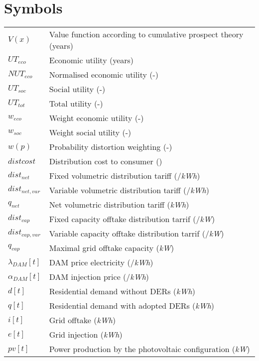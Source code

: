 \documentclass[master=ene,english]{kulemt}
\begin{document}
\section*{Symbols}
\begin{flushleft}
  \renewcommand{\arraystretch}{1.1}
  \begin{tabularx}{\textwidth}{@{}p{12mm}X@{}}
    $V(x)$    & Value function according to cumulative prospect theory (years)\\
    $UT_{eco}$   & Economic utility (years) \\
    $NUT_{eco}$   & Normalised economic utility (-)\\
    $UT_{soc}$ & Social utility (-)\\
    $UT_{tot}$ & Total utility (-)\\
    $w_{eco}$ & Weight economic utility (-)\\
    $w_{soc}$ & Weight social utility (-)\\
    $w(p)$   & Probability distortion weighting (-)\\
    $distcost$ & Distribution cost to consumer (\EUR{})\\
    $dist_{net}$ & Fixed volumetric distribution tariff (\EUR{}/\textit{kWh})\\
    $dist_{net,var}$ & Variable volumetric distribution tariff (\EUR{}/\textit{kWh})\\
    $q_{net}$ & Net volumetric distribution tariff (\textit{kWh}) \\
    $dist_{cap}$ & Fixed capacity offtake distribution tarrif (\EUR{}/\textit{kW})\\
    $dist_{cap,var}$ & Variable capacity offtake distribution tarrif (\EUR{}/\textit{kW})\\
    $q_{cap}$ & Maximal grid offtake capacity (\textit{kW})\\
    $\lambda_{DAM}[t]$ & DAM price electricity (\EUR{}/\textit{kWh})\\
    $\alpha_{DAM}[t]$ & DAM injection price (\EUR{}/\textit{kWh})\\
    $d[t]$ & Residential demand without DERs (\textit{kWh})\\
    $q[t]$ & Residential demand with adopted DERs (\textit{kWh})\\
    $i[t]$ & Grid offtake (\textit{kWh})\\
    $e[t]$ & Grid injection (\textit{kWh})\\
    $pv[t]$ & Power production by the photovoltaic configuration (\textit{kW})\\

\end{tabularx}
\end{flushleft}
\end{document}
